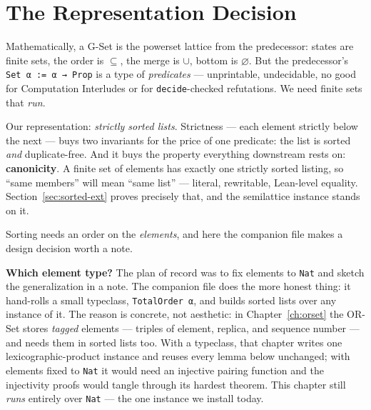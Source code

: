 \documentclass[12pt, a4paper, openright]{book}
\theoremstyle{thmstyle}
\theoremstyle{defstyle}
\newcommand{\lc}[1]{\texttt{#1}}
\newenvironment{notebox}{%
  \begin{tcolorbox}[notebox]%
}{\end{tcolorbox}}
\newcounter{refutation}[chapter]
\begin{document}
\section{The Representation Decision}

Mathematically, a G-Set is the powerset lattice from the predecessor:
states are finite sets, the order is $\subseteq$, the merge is $\cup$,
bottom is $\varnothing$. But the predecessor's \lc{Set α := α → Prop} is
a type of \emph{predicates} --- unprintable, undecidable, no good for
Computation Interludes or for \lc{decide}-checked refutations. We need
finite sets that \emph{run}.

Our representation: \emph{strictly sorted lists}. Strictness ---
each element strictly below the next --- buys two invariants for the
price of one predicate: the list is sorted \emph{and} duplicate-free.
And it buys the property everything downstream rests on:
\textbf{canonicity}. A finite set of elements has exactly one strictly
sorted listing, so ``same members'' will mean ``same list'' --- literal,
rewritable, Lean-level equality. Section~\ref{sec:sorted-ext} proves
precisely that, and the semilattice instance stands on it.

Sorting needs an order on the \emph{elements}, and here the companion
file makes a design decision worth a note.

\begin{notebox}
  \textbf{Which element type?} The plan of record was to fix elements to
  \lc{Nat} and sketch the generalization in a note. The companion file
  does the more honest thing: it hand-rolls a small typeclass,
  \lc{TotalOrder α}, and builds sorted lists over any instance of it.
  The reason is concrete, not aesthetic: in Chapter~\ref{ch:orset} the
  OR-Set stores \emph{tagged} elements --- triples of element, replica,
  and sequence number --- and needs them in sorted lists too. With a
  typeclass, that chapter writes one lexicographic-product instance and
  reuses every lemma below unchanged; with elements fixed to \lc{Nat} it
  would need an injective pairing function and the injectivity proofs
  would tangle through its hardest theorem. This chapter still
  \emph{runs} entirely over \lc{Nat} --- the one instance we install
  today.
\end{notebox}
\end{document}
